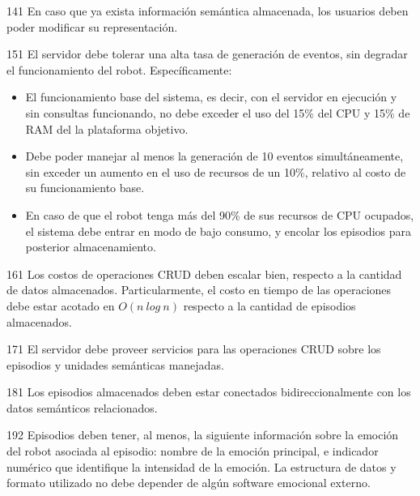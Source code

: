 \begin{requisito-sistema}{14}{1}
	En caso que ya exista información semántica almacenada, los usuarios deben poder modificar su representación.	
\end{requisito-sistema}

\begin{requisito-sistema}{15}{1}
	El servidor debe tolerar una alta tasa de generación de eventos, sin degradar el funcionamiento del robot. Específicamente:
	\begin{itemize}
		\item El funcionamiento base del sistema, es decir, con el servidor en ejecución y sin consultas funcionando, no debe exceder el uso del 15\% del CPU y 15\% de RAM del la plataforma objetivo.
		\item Debe poder manejar al menos la generación de 10 eventos simultáneamente, sin exceder un aumento en el uso de recursos de un 10\%, relativo al costo de su funcionamiento base.
		\item En caso de que el robot tenga más del 90\% de sus recursos de CPU ocupados, el sistema debe entrar en modo de bajo consumo, y encolar los episodios para posterior almacenamiento.
	\end{itemize}
\end{requisito-sistema}

\begin{requisito-sistema}{16}{1}
	Los costos de operaciones CRUD deben escalar bien, respecto a la cantidad de datos almacenados. Particularmente, el costo en tiempo de las operaciones debe estar acotado en $O(n\ log\ n)$ respecto a la cantidad de episodios almacenados.	
\end{requisito-sistema}

\begin{requisito-sistema}{17}{1}
	El servidor debe proveer servicios para las operaciones CRUD sobre los episodios y unidades semánticas manejadas.	
\end{requisito-sistema}

\begin{requisito-sistema}{18}{1}
	Los episodios almacenados deben estar conectados bidireccionalmente con los datos semánticos relacionados.	
\end{requisito-sistema}

\begin{requisito-sistema}{19}{2}
	Episodios deben tener, al menos, la siguiente información sobre la emoción del robot asociada al episodio: nombre de la emoción principal, e indicador numérico que identifique la intensidad de la emoción. La estructura de datos y formato utilizado no debe depender de algún software emocional externo.
\end{requisito-sistema}

